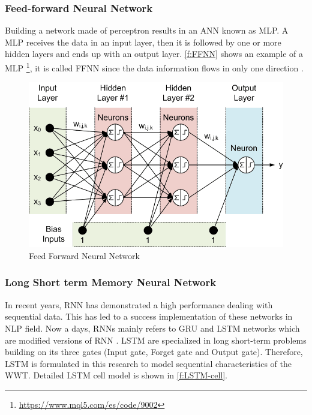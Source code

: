 \subsubsection{Feed-forward Neural Network}
Building a network made of perceptron results in an \ac{ANN} known as \ac{MLP}. A \ac{MLP} receives the data in an input layer, then it is followed by one or more hidden layers and ends up with an output layer.
\autoref{f:FFNN} shows an example of a \ac{MLP} \footnote{\url{https://www.mql5.com/es/code/9002}}, it is called \ac{FFNN} since the data information flows in only one direction \cite{geron2017}. 

\begin{figure}[h]
\centering
\includegraphics[width=12cm]{figures/Ch2/FFNN.png}
\caption{Feed Forward Neural Network}
\label{f:FFNN}
\end{figure}

\subsubsection{Long Short term Memory Neural Network}
In recent years, \ac{RNN} has demonstrated a high performance dealing with sequential data. This has led to a success implementation of these networks in \ac{NLP} field.
Now a days, \ac{RNN}s mainly refers to \ac{GRU} and \ac{LSTM} networks which are modified versions of \ac{RNN} \cite{Guo2020}. \ac{LSTM} are specialized in long short-term problems building on its three gates (Input gate, Forget gate and Output gate). Therefore, LSTM is formulated in this research to model sequential characteristics of the \ac{WWT}. Detailed \ac{LSTM} cell model is shown in \autoref{f:LSTM-cell}.

